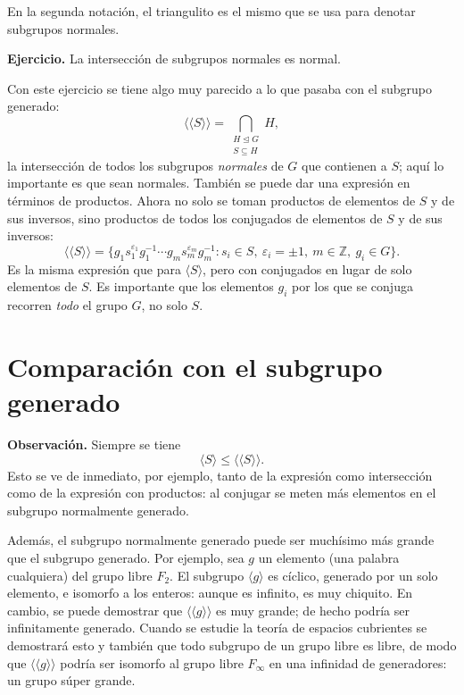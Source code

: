 \documentclass[11pt]{article}
\begin{document}
En la segunda notación, el triangulito es el mismo que se usa para denotar subgrupos normales.

\medskip\noindent\textbf{Ejercicio.} La intersección de subgrupos normales es normal.

\medskip
Con este ejercicio se tiene algo muy parecido a lo que pasaba con el subgrupo generado:
\[
  \langle\!\langle S\rangle\!\rangle=\bigcap_{\substack{H\trianglelefteq G\\ S\subseteq H}}H,
\]
la intersección de todos los subgrupos \emph{normales} de $G$ que contienen a $S$; aquí lo importante es que sean normales. También se puede dar una expresión en términos de productos. Ahora no solo se toman productos de elementos de $S$ y de sus inversos, sino productos de todos los conjugados de elementos de $S$ y de sus inversos:
\[
  \langle\!\langle S\rangle\!\rangle=\{g_1s_1^{\varepsilon_1}g_1^{-1}\cdots g_ms_m^{\varepsilon_m}g_m^{-1} : s_i\in S,\ \varepsilon_i=\pm1,\ m\in\mathbb{Z},\ g_i\in G\}.
\]
Es la misma expresión que para $\langle S\rangle$, pero con conjugados en lugar de solo elementos de $S$. Es importante que los elementos $g_i$ por los que se conjuga recorren \emph{todo} el grupo $G$, no solo $S$.

\section*{Comparación con el subgrupo generado}

\noindent\textbf{Observación.} Siempre se tiene
\[
  \langle S\rangle\leq\langle\!\langle S\rangle\!\rangle.
\]
Esto se ve de inmediato, por ejemplo, tanto de la expresión como intersección como de la expresión con productos: al conjugar se meten más elementos en el subgrupo normalmente generado.

Además, el subgrupo normalmente generado puede ser muchísimo más grande que el subgrupo generado. Por ejemplo, sea $g$ un elemento (una palabra cualquiera) del grupo libre $F_2$. El subgrupo $\langle g\rangle$ es cíclico, generado por un solo elemento, e isomorfo a los enteros: aunque es infinito, es muy chiquito. En cambio, se puede demostrar que $\langle\!\langle g\rangle\!\rangle$ es muy grande; de hecho podría ser infinitamente generado. Cuando se estudie la teoría de espacios cubrientes se demostrará esto y también que todo subgrupo de un grupo libre es libre, de modo que $\langle\!\langle g\rangle\!\rangle$ podría ser isomorfo al grupo libre $F_\infty$ en una infinidad de generadores: un grupo súper grande.
\end{document}
